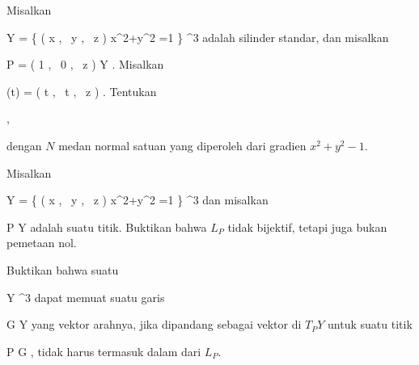 {}
{

Misalkan

\mavergleichskettedisp
{\vergleichskette
{ Y
}
{ =} { \left\{  \left(  x   , \,   y  , \,  z                 \right)   \mid   x^2+y^2 =1         \right\}
}
{ \subseteq} { \R^3
}
{ } {
}
{ } {
}
}
{}{}{}
adalah silinder standar, dan misalkan

\mavergleichskette
{\vergleichskette
{ P
}
{ = }{ \left(  1   , \,   0  , \,  z                 \right)
}
{ \in }{ Y
}
{    }{
}
{   }{
}
}
{}{}{.}
Misalkan

\mavergleichskettedisp
{\vergleichskette
{ \gamma(t)
}
{ =} { \left(  \cos  t   , \,   \sin  t  , \,  z                 \right)
}
{ } {
}
{ } {
}
{ } {
}
}
{}{}{.}
Tentukan

 { , }

dengan $N$ medan normal satuan yang diperoleh dari gradien $x^2+y^2-1$.

}
{} {}

{}
{

Misalkan

\mavergleichskettedisp
{\vergleichskette
{ Y
}
{ =} { \left\{  \left(  x   , \,   y  , \,  z                 \right)   \mid   x^2+y^2 =1         \right\}
}
{ \subseteq} { \R^3
}
{ } {
}
{ } {
}
}
{}{}{}
dan misalkan

\mavergleichskette
{\vergleichskette
{ P
}
{ \in }{ Y
}
{  }{
}
{    }{
}
{   }{}
}
{}{}{}
adalah suatu titik. Buktikan bahwa
$L_P$ tidak bijektif, tetapi juga bukan pemetaan nol.

}
{} {}

{}
{

Buktikan bahwa suatu

\mavergleichskette
{\vergleichskette
{ Y
}
{ \subseteq }{ \R^3
}
{  }{
}
{    }{
}
{   }{
}
}
{}{}{}
dapat memuat suatu garis

\mavergleichskette
{\vergleichskette
{ G
}
{ \subseteq }{ Y
}
{  }{
}
{    }{
}
{   }{
}
}
{}{}{}
yang vektor arahnya, jika dipandang sebagai vektor di
$T_PY$ untuk suatu titik

\mavergleichskette
{\vergleichskette
{ P
}
{ \in }{ G
}
{  }{
}
{    }{
}
{   }{
}
}
{}{}{,}
tidak harus termasuk dalam
dari
$L_P$.

}
{} {}

